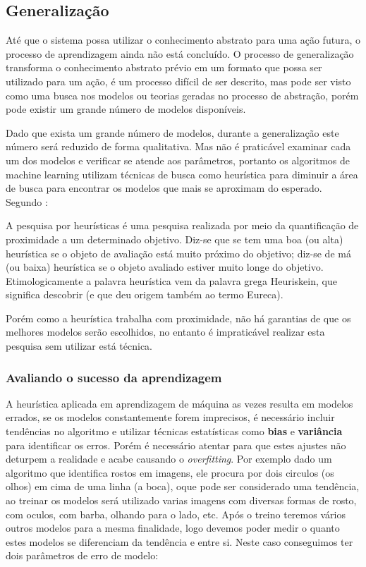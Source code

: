 \subsection{Generalização}
\label{subsec:generalização-dados}

Até que o sistema possa utilizar o conhecimento abstrato para uma ação futura, o processo de aprendizagem ainda não está concluído.
O processo de generalização transforma o conhecimento abstrato prévio em um formato que possa ser utilizado para um ação, é um 
processo difícil de ser descrito, mas pode ser visto como uma busca nos modelos ou teorias geradas no processo de abstração, porém pode existir
um grande número de modelos disponíveis.

Dado que exista um grande número de modelos, durante a generalização este número será reduzido de forma qualitativa. 
Mas não é praticável examinar cada um dos modelos e verificar se atende aos parâmetros, portanto os algoritmos de machine learning utilizam 
técnicas de busca como heurística para diminuir a área de busca para encontrar os modelos que mais se aproximam do esperado.
Segundo \cite{heuristica}:
\begin{citacao}
A pesquisa por heurísticas é uma pesquisa realizada por meio da quantificação de proximidade a um determinado objetivo. 
Diz-se que se tem uma boa (ou alta) heurística se o objeto de avaliação está muito próximo do objetivo; diz-se de má (ou baixa) heurística 
se o objeto avaliado estiver muito longe do objetivo. 
Etimologicamente a palavra heurística vem da palavra grega Heuriskein, que significa descobrir (e que deu origem também ao termo Eureca).
\end{citacao} 


Porém como a heurística trabalha com proximidade, não há garantias de que os melhores modelos serão escolhidos, 
no entanto é impraticável realizar esta pesquisa sem utilizar está técnica.

\subsubsection{Avaliando o sucesso da aprendizagem}
\label{subsec:avaliando-generalização-dados}

A heurística aplicada em aprendizagem de máquina as vezes resulta em modelos errados, se os modelos constantemente 
forem imprecisos, é necessário incluir tendências no algoritmo e utilizar técnicas estatísticas como \textbf{bias} e \textbf{variância} 
para identificar os erros. Porém é necessário atentar para que estes ajustes não deturpem a realidade e acabe causando o \textit{overfitting}.
Por exemplo dado um algoritmo que identifica rostos em imagens, ele procura por dois circulos (os olhos) em cima de uma linha (a boca), oque pode 
ser considerado uma tendência, ao treinar os modelos será utilizado varias imagens com diversas formas de rosto, com oculos, 
com barba, olhando para o lado, etc.
Após o treino teremos vários outros modelos para a mesma finalidade, logo devemos poder medir o quanto estes modelos 
se diferenciam da tendência e entre si. Neste caso conseguimos ter dois parâmetros de erro de modelo:

